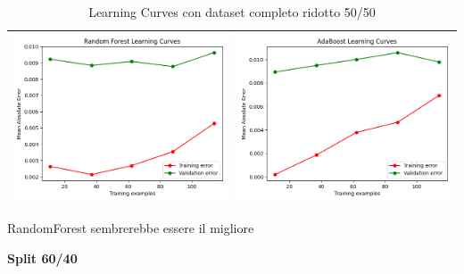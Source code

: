 \begin{table}[H]
\begin{tabularx}{\textwidth}{|X|X|}
        \includegraphics[width=\linewidth, trim=0 0 0 0]{images/RandomForest_lc50_ridotto.png} &
        \includegraphics[width=\linewidth, trim=0 0 0 0]{images/AdaBoost_lc50_ridotto.png} \\
        \hline
    \end{tabularx}
    \caption{Learning Curves con dataset completo ridotto 50/50}
    \label{tab:emissions_info}
\end{table}

\noindent RandomForest sembrerebbe essere il migliore


\noindent\textbf{Split 60/40}



